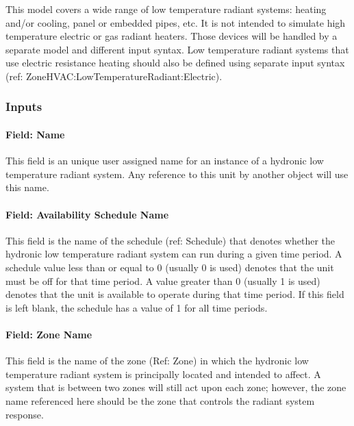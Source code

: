 This model covers a wide range of low temperature radiant systems: heating and/or cooling, panel or embedded pipes, etc. It is not intended to simulate high temperature electric or gas radiant heaters. Those devices will be handled by a separate model and different input syntax. Low temperature radiant systems that use electric resistance heating should also be defined using separate input syntax (ref: ZoneHVAC:LowTemperatureRadiant:Electric).

\subsubsection{Inputs}\label{inputs-5-022}

\paragraph{Field: Name}\label{field-name-5-018}

This field is an unique user assigned name for an instance of a hydronic low temperature radiant system. Any reference to this unit by another object will use this name.

\paragraph{Field: Availability Schedule Name}\label{field-availability-schedule-name-5-003}

This field is the name of the schedule (ref: Schedule) that denotes whether the hydronic low temperature radiant system can run during a given time period. A schedule value less than or equal to 0 (usually 0 is used) denotes that the unit must be off for that time period. A value greater than 0 (usually 1 is used) denotes that the unit is available to operate during that time period. If this field is left blank, the schedule has a value of 1 for all time periods.

\paragraph{Field: Zone Name}\label{field-zone-name-009}

This field is the name of the zone (Ref: Zone) in which the hydronic low temperature radiant system is principally located and intended to affect. A system that is between two zones will still act upon each zone; however, the zone name referenced here should be the zone that controls the radiant system response.

